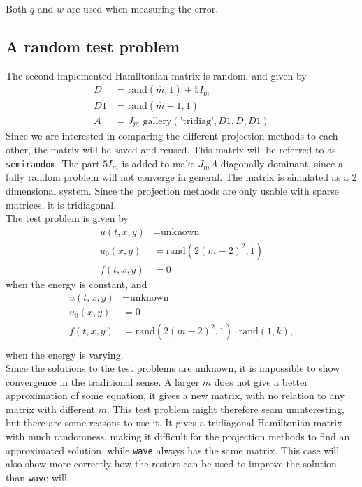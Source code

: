 Both $q$ and $w$ are used when measuring the error. \\

\subsection{A random test problem} %
The second implemented Hamiltonian matrix is random, and given by
\begin{equation*}
\begin{aligned}
D &= \text{rand}(\hat{m},1) + 5 I_{\hat{m}} \\
D1 & = \text{rand}(\hat{m}-1,1) \\
A &= J_{\hat{m}} \text{ gallery}(\text{'tridiag'},D1,D,D1)
\end{aligned}
\end{equation*}
Since we are interested in comparing the different projection methods to each other, the matrix will be saved and reused. This matrix will be referred to as \texttt{semirandom}. The part $5 I_{\hat{m}} $ is added to make $J_{\hat{m}}A$ diagonally dominant, since a fully random problem will not converge in general. The matrix is simulated as a 2 dimensional system. Since the projection methods are only usable with sparse matrices, it is tridiagonal.\\
The test problem is given by
\begin{equation*}
\begin{aligned}
u(t,x,y) &= \text{unknown} \\
u_0(x,y) &= \text{rand} (2 (m-2)^2,1) \\
f(t,x,y) &= 0
\end{aligned}
\end{equation*}
when the energy is constant, and 
\begin{equation*}
\begin{aligned}
u(t,x,y) &= \text{unknown} \\
u_0(x,y) &= 0 \\
f(t,x,y) &= \text{rand} (2 (m-2)^2,1) \cdot \text{rand}(1,k), \\
\end{aligned}
\end{equation*}
when the energy is varying.\\

Since the solutions to the test problems are unknown, it is impossible to show convergence in the traditional sense. A larger $m$ does not give a better approximation of some equation, it gives a new matrix, with no relation to any matrix with different $m$. This test problem might therefore seam uninteresting, but there are some reasons to use it. It gives a tridiagonal Hamiltonian matrix with much randomness, making it difficult for the projection methods to find an approximated solution, while \texttt{wave} always has the same matrix. This case will also show more correctly how the restart can be used to improve the solution than \texttt{wave} will.  \\

